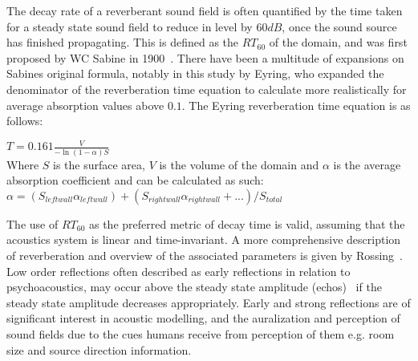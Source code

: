 The decay rate of a reverberant sound field is often quantified by the time taken for a steady state sound field to reduce in level by $60{dB}$, once the sound source has finished propagating. This is defined as the $RT_{60}$ of the domain, and was first proposed by WC Sabine in 1900~\cite{Everest2009}. There have been a multitude of expansions on Sabines original formula, notably in this study by Eyring, who expanded the denominator of the reverberation time equation to calculate more realistically for average absorption values above $0.1$. The Eyring reverberation time equation is as follows:\\
\begin{center}
$T = 0.161\frac{V}{-\ln(1 - \alpha)S} $\\
Where $S$ is the surface area, $V$ is the volume of the domain and $\alpha$ is the average absorption coefficient and can be calculated as such:\\
$\alpha = (S_{leftwall} \alpha_{leftwall})+(S_{rightwall} \alpha_{rightwall}+...)/S_{total}$ \\
\end{center}
The use of $RT_{60}$ as the preferred metric of decay time is valid, assuming that the acoustics system is linear and time-invariant.
A more comprehensive description of reverberation and overview of the associated parameters is given by Rossing~\cite{rossing2007springer}. \\

Low order reflections often described as early reflections in relation to psychoacoustics, may occur above the steady state amplitude (echos)~\cite{Everest2009} if the steady state amplitude decreases appropriately. Early and strong reflections are of significant interest in acoustic modelling, and the auralization and perception of sound fields due to the cues humans receive from perception of them e.g. room size and source direction information.\\

